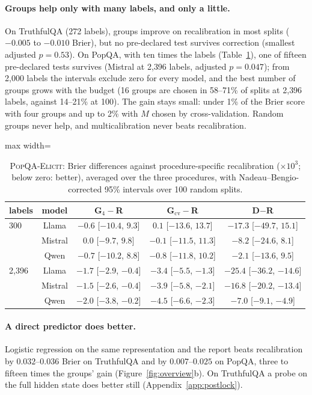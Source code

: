 \documentclass[twoside]{article}
\theoremstyle{definition}
\theoremstyle{remark}
\newcommand{\1}{\mathbf{1}}
\newcommand{\expname}[1]{\textsc{#1}}
\begin{document}
\paragraph{Groups help only with many labels, and only a little.} On TruthfulQA (272 labels),
groups improve on recalibration in most splits ($-0.005$ to $-0.010$ Brier), but no pre-declared test survives
correction (smallest adjusted $p=0.53$). On PopQA, with ten times the labels (Table~\ref{tab:popqa}), one of
fifteen pre-declared tests survives (Mistral at 2{,}396 labels, adjusted $p=0.047$); from 2{,}000 labels the
intervals exclude zero for every model, and the best number of groups grows with the budget (16 groups are
chosen in 58--71\% of splits at 2{,}396 labels, against 14--21\% at 100). The gain stays small: under 1\% of
the Brier score with four groups and up to 2\% with $M$ chosen by cross-validation. Random groups never help,
and multicalibration never beats recalibration.
\begin{table}[t]
\caption{\expname{PopQA-Elicit}: Brier differences against procedure-specific recalibration ($\times10^3$; below zero: better), averaged over the three procedures, with Nadeau--Bengio-corrected 95\% intervals over 100 random splits.}
\centering\small
\begin{adjustbox}{max width=\textwidth}
\begin{tabular}{lcccc}
\toprule
labels & model & G$_4-$R & G$_{\mathrm{cv}}-$R & D$-$R\\
\midrule
300  & Llama   & $-0.6$ [$-10.4$, $9.3$] & $0.1$ [$-13.6$, $13.7$] & $-17.3$ [$-49.7$, $15.1$]\\
     & Mistral & $0.0$ [$-9.7$, $9.8$]   & $-0.1$ [$-11.5$, $11.3$] & $-8.2$ [$-24.6$, $8.1$]\\
     & Qwen    & $-0.7$ [$-10.2$, $8.8$] & $-0.8$ [$-11.8$, $10.2$] & $-2.1$ [$-13.6$, $9.5$]\\
2{,}396 & Llama   & $-1.7$ [$-2.9$, $-0.4$] & $-3.4$ [$-5.5$, $-1.3$] & $-25.4$ [$-36.2$, $-14.6$]\\
     & Mistral & $-1.5$ [$-2.6$, $-0.4$] & $-3.9$ [$-5.8$, $-2.1$] & $-16.8$ [$-20.2$, $-13.4$]\\
     & Qwen    & $-2.0$ [$-3.8$, $-0.2$] & $-4.5$ [$-6.6$, $-2.3$] & $-7.0$ [$-9.1$, $-4.9$]\\
\bottomrule
\end{tabular}
\label{tab:popqa}
\end{adjustbox}
\end{table}

\paragraph{A direct predictor does better.} Logistic regression on the same representation and the report
beats recalibration by $0.032$--$0.036$ Brier on TruthfulQA and by $0.007$--$0.025$ on PopQA, three to fifteen
times the groups' gain (Figure~\ref{fig:overview}b). On TruthfulQA a probe on the full hidden state does better
still (Appendix~\ref{app:postlock}).
\end{document}
